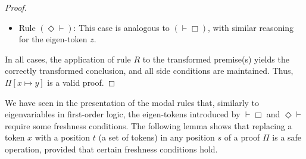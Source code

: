 \documentclass{article}
\newcommand{\seq}[2]{{#1} \vdash{} {#2}}
\newcommand{\pf}[2]{{#1}^{#2}} %
\newcommand{\commento}[1]{}
\theoremstyle{definition}
\begin{document}
{\begin{proof}
\begin{description}
\begin{enumerate}
\begin{itemize}
\begin{enumerate}
                \item If $z \neq x$:
                The eigen-token remains $z$.
                The transformed premise formula is
                $\pf{A}{(s_0,z)[x \mapsto y]} = \pf{A}{s_0[x \mapsto y],z}$.
                The rule application becomes:
                \[
                \AxiomC{$\seq{\Sigma[x \mapsto y]}{\pf{A}{s_0[x \mapsto y],z}, \Lambda[x \mapsto y]}$}
                \RightLabel{$\vdash \Box$}
                \UnaryInfC{$\seq{\Sigma[x \mapsto y]}{\pf{\Box A}{s_0[x \mapsto y]}, \Lambda[x \mapsto y]}$}
                \DisplayProof
                \]
                Side conditions for $z$:
                (a) $z \notin s_0[x \mapsto y]$: Original was $z \notin s_0$. Since $z \neq x$ and $y$ is fresh (so $z \neq y$), the substitution $[x \mapsto y]$ in $s_0$ cannot introduce $z$ if $z$ was not in $s_0$. Thus, this holds.
                (b) $z$ is fresh for $\Sigma[x \mapsto y], \Lambda[x \mapsto y]$: Original was $z$ fresh for $\Sigma, \Lambda$. Since $z \neq x$ and $y$ is fresh (so $z \neq y$), $z$ remains fresh for the transformed contexts.
            \end{enumerate}
            In both subcases, the rule application is valid.

            \item Rule $(\Diamond \vdash)$: This case is analogous to $(\vdash \Box)$, with similar reasoning for the eigen-token $z$.
        \end{itemize}
    \end{enumerate}
\end{description}
In all cases, the application of rule $R$ to the transformed premise(s) yields the correctly transformed conclusion, and all side conditions are maintained. Thus, $\Pi[x \mapsto y]$ is a valid proof.
\end{proof}
}%

We have seen in the presentation of the modal rules that, similarly to
eigenvariables in first-order logic, the eigen-tokens introduced by
$\vdash \Box$ and $\Diamond \vdash$ require some freshness conditions.
The following lemma shows that replacing a token $x$ with a position $t$
(a set of tokens) in any position $s$ of a proof $\Pi$ is a safe operation,
provided that certain freshness conditions hold.
\end{document}
